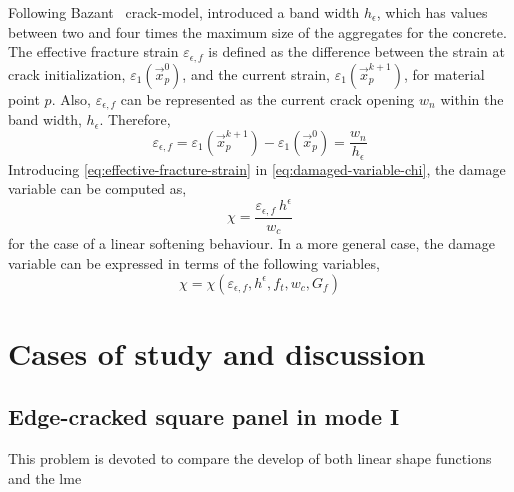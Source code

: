 \message{ !name(2020_EFM_MPM_Eigensoftening.tex)}\documentclass[preprint,12pt,a4paper]{elsarticle}
\begin{document}
Following Bazant~\cite{Bazant83} crack-model, \cite{Navas_2017_ES}
introduced a band width $h_{\epsilon}$, which has values between two
and four times the maximum size of the aggregates for the
concrete. The effective fracture strain $\varepsilon_{\epsilon,f}$ is
defined as the difference between the strain at crack initialization,
$\varepsilon_1(\vec{x}_p^{0})$, and the current strain, $\varepsilon_1(\vec{x}_p^{k+1})$, for material
point $p$. Also, $\varepsilon_{\epsilon,f}$ can be represented as the
current crack opening $w_n$ within the band width,
$h_{\epsilon}$. Therefore,
\begin{equation}
  \label{eq:effective-fracture-strain}
  \varepsilon_{\epsilon,f} = \varepsilon_1(\vec{x}_p^{k+1}) -
  \varepsilon_1(\vec{x}_p^{0}) = \frac{w_n}{h_{\epsilon}}
\end{equation}
Introducing \eqref{eq:effective-fracture-strain} in
\eqref{eq:damaged-variable-chi}, the damage variable can be computed
as,
\begin{equation}
  \label{eq:damage-variable-chi-II}
\chi = \frac{\varepsilon_{\epsilon,f}\ h^{\epsilon}}{w_c}  
\end{equation}
for the case of a linear softening behaviour. In a more general case,
the damage variable can be expressed in terms of the following
variables,
\begin{equation}
  \label{eq:damage-variable-chi-III}
  \chi = \chi(\varepsilon_{\epsilon,f}, h^{\epsilon}, f_t, w_c, G_f)
\end{equation}
\section{Cases of study and discussion}
\label{sec:3}

\subsection{Edge-cracked square panel in mode I}
\label{sec:edge-cracked-square-I}

This problem is devoted to compare the develop of both linear shape
functions and the \acrshort{lme}
\end{document}
